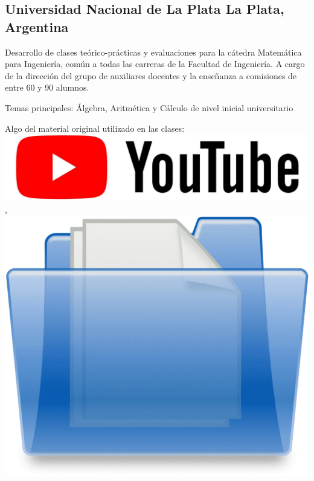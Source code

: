 
\subsection{{Universidad Nacional de La Plata \hfill  La Plata, Argentina}}
\begin{zitemize}
\item Desarrollo de clases teórico-prácticas y evaluaciones para la cátedra Matemática para Ingeniería, común a todas las carreras de la Facultad de Ingeniería. A cargo de la dirección del grupo de auxiliares docentes y la enseñanza a comisiones de entre 60 y 90 alumnos.
\item Temas principales: Álgebra, Aritmética y Cálculo de nivel inicial universitario
\item Algo del material original utilizado en las clases: \href{https://youtube.com/@gervasiojj?si=rgT2OySzyoKvKuKf}{\includegraphics[scale=0.025]{youtube.jpg}}, \href{https://drive.google.com/drive/folders/1JRLtP1kGEmH1EG_l8BVq4oRaHBvnXLOU?usp=sharing}{\includegraphics[scale=0.01]{folder.png}}
\end{zitemize}

